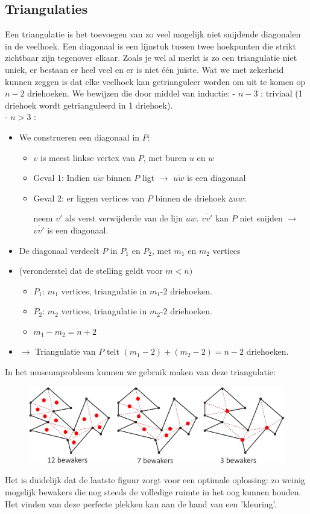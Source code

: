 \documentclass[12pt,a4paper]{article}
\begin{document}
	\subsection{Triangulaties}
	Een triangulatie is het toevoegen van zo veel mogelijk niet snijdende diagonalen in de veelhoek. Een diagonaal is een lijnstuk tussen twee hoekpunten die strikt zichtbaar zijn tegenover elkaar. Zoals je wel al merkt is zo een triangulatie niet uniek, er bestaan er heel veel en er is niet één juiste. Wat we met zekerheid kunnen zeggen is dat elke veelhoek kan getrianguleer worden om uit te komen op $n-2$ driehoeken. We bewijzen die door middel van inductie: 
	- $n-3$ : triviaal (1 driehoek wordt getrianguleerd in 1 driehoek).\\
	- $n > 3$ : 
	\begin{itemize}
		\item We construeren een diagonaal in $P$:
		\begin{itemize}
			\item $v$ is meest linkse vertex van $P$, met buren $u$ en $w$
			\item Geval 1: Indien $\overline{uw}$ binnen $P$ ligt $\rightarrow$ $\overline{uw}$ is een diagonaal
			\item Geval 2: er liggen vertices van $P$ binnen de driehoek $\vartriangle uw$:
			
			neem $v'$ als verst verwijderde van de lijn $\overline{uw}$. $\overline{vv'}$ kan $P$ niet snijden $\rightarrow$ $\overline{vv'}$ is een diagonaal. 
		\end{itemize}
		\item De diagonaal verdeelt $P$ in $P_1$ en $P_2$, met $m_1$ en $m_2$ vertices
		\item (veronderstel dat de stelling geldt voor $m<n)$
		\begin{itemize}
			\item $P_1$: $m_1$ vertices, triangulatie in $m_1$-2 driehoeken. 
			\item $P_2$: $m_2$ vertices, triangulatie in $m_2$-2 driehoeken. 
			\item $m_1 - m_2 = n+2$
		\end{itemize}
		\item $\rightarrow$ Triangulatie van $P$ telt $(m_1 -2) + (m_2 - 2) = n-2$ driehoeken. 
	\end{itemize}
	In het museumprobleem kunnen we gebruik maken van deze triangulatie: 
	\begin{figure}[H]
		\centering
		\includegraphics[width=0.9\linewidth]{afbeeldingen/triangulatie-bewakers}
		\label{fig:triangulatie-bewakers}
	\end{figure}
	Het is duidelijk dat de laatste figuur zorgt voor een optimale oplossing: zo weinig mogelijk bewakers die nog steeds de volledige ruimte in het oog kunnen houden. Het vinden van deze perfecte plekken kan aan de hand van een 'kleuring'. 
	
\end{document}
